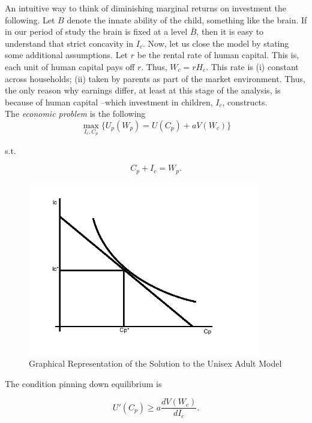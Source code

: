 \indent An intuitive way to think of diminishing marginal returns on investment the following. Let $B$ denote the innate ability of the child, something like the brain. If in our period of study the brain is fixed at a level $\bar{B}$, then it is easy to understand that strict concavity in $I_{c}$. Now, let us close the model by stating some additional assumptions. Let $r$ be the rental rate of human capital. This is, each unit of human capital pays off $r$. Thus, $W_{c} = r H_{c}$. This rate is (i) constant across households; (ii) taken by parents as part of the market environment. Thus, the only reason why earnings differ, at least at this stage of the analysis, is because of human capital --which investment in children, $I_{c}$, constructs.\\

\indent The \textit{economic problem} is the following
\begin{equation}
\max_{I_{c}, C_{p}} \{ U_{p} (W_{p}) = U(C_{p}) + a V(W_{c}) \}
\end{equation}  

\noindent s.t.

\begin{equation}
C_{p} + I_{c} = W_{p}. \label{eq:constraint}
\end{equation}

\begin{center}
\begin{figure}[H] 
\caption{Graphical Representation of the Solution to the Unisex Adult Model}
\centering
\includegraphics[width=4in, height=3in]{Plots/EconProb.png}
\end{figure}
\end{center}


\indent The condition pinning down equilibrium is 

\begin{equation}
U'(C_{p}) \geq a \frac{d V(W_{c})}{d I_{c}}. \label{eq:mrs}
\end{equation}

